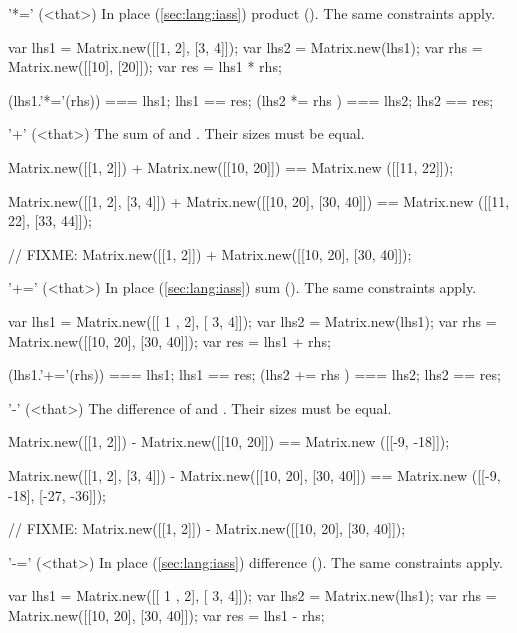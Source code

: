 \begin{urbiscriptapi}
\item['*='](<that>)%
  In place (\autoref{sec:lang:iass}) product ().  The same
  constraints apply.
\begin{urbiassert}
var lhs1 = Matrix.new([[1, 2], [3, 4]]);
var lhs2 = Matrix.new(lhs1);
var rhs = Matrix.new([[10], [20]]);
var res = lhs1 * rhs;

(lhs1.'*='(rhs)) === lhs1;  lhs1 == res;
(lhs2  *=  rhs ) === lhs2;  lhs2 == res;
\end{urbiassert}


\item['+'](<that>)%
  The sum of \this and \that.  Their sizes must be equal.
\begin{urbiassert}
Matrix.new([[1, 2]]) + Matrix.new([[10, 20]])
  == Matrix.new ([[11, 22]]);

Matrix.new([[1, 2], [3, 4]]) + Matrix.new([[10, 20], [30, 40]])
  == Matrix.new ([[11, 22], [33, 44]]);

// FIXME: Matrix.new([[1, 2]]) + Matrix.new([[10, 20], [30, 40]]);
\end{urbiassert}


\item['+='](<that>)%
  In place (\autoref{sec:lang:iass}) sum ().  The same
  constraints apply.
\begin{urbiassert}
var lhs1 = Matrix.new([[ 1 , 2], [ 3,  4]]);
var lhs2 = Matrix.new(lhs1);
var rhs = Matrix.new([[10, 20], [30, 40]]);
var res = lhs1 + rhs;

(lhs1.'+='(rhs)) === lhs1;  lhs1 == res;
(lhs2  +=  rhs ) === lhs2;  lhs2 == res;
\end{urbiassert}


\item['-'](<that>)%
  The difference of \this and \that.  Their sizes must be equal.
\begin{urbiassert}
Matrix.new([[1, 2]]) - Matrix.new([[10, 20]])
  == Matrix.new ([[-9, -18]]);

Matrix.new([[1, 2], [3, 4]]) - Matrix.new([[10, 20], [30, 40]])
  == Matrix.new ([[-9, -18], [-27, -36]]);

// FIXME: Matrix.new([[1, 2]]) - Matrix.new([[10, 20], [30, 40]]);
\end{urbiassert}


\item['-='](<that>)%
  In place (\autoref{sec:lang:iass}) difference ().  The same
  constraints apply.
\begin{urbiassert}
var lhs1 = Matrix.new([[ 1 , 2], [ 3,  4]]);
var lhs2 = Matrix.new(lhs1);
var rhs = Matrix.new([[10, 20], [30, 40]]);
var res = lhs1 - rhs;


\end{urbiassert}
\end{urbiscriptapi}
